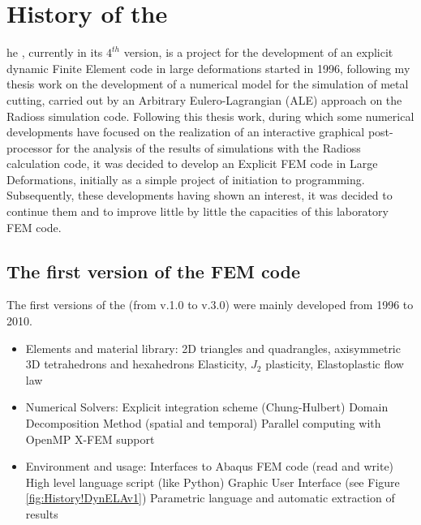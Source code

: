 %
%
%
\chapter{History of the \DynELA}\label{Chapter!History}

\startcontents[chapters]
\printmyminitoc[2]he \DynELA, currently in its $4^{th}$ version, is a project for the development of an explicit dynamic Finite Element code in large deformations started in 1996, following my thesis work on the development of a numerical model for the simulation of metal cutting, carried out by an Arbitrary Eulero-Lagrangian (ALE) approach on the Radioss simulation code. Following this thesis work, during which some numerical developments have focused on the realization of an interactive graphical post-processor for the analysis of the results of simulations with the Radioss calculation code, it was decided to develop an Explicit FEM code in Large Deformations, initially as a simple project of initiation to programming. Subsequently, these developments having shown an interest, it was decided to continue them and to improve little by little the capacities of this laboratory FEM code.

\section{The first version of the FEM code}
The first versions of the \DynELA (from v.1.0 to v.3.0) were mainly developed from 1996 to 2010.
\begin{itemize}
\item Elements and material library:
\subitem 2D triangles and quadrangles, axisymmetric
\subitem 3D tetrahedrons and hexahedrons
\subitem Elasticity, $J_{2}$ plasticity, Elastoplastic flow law
\item Numerical Solvers:
\subitem Explicit integration scheme (Chung-Hulbert)
\subitem Domain Decomposition Method (spatial and temporal)
\subitem Parallel computing with OpenMP
\subitem X-FEM support
\item Environment and usage:
\subitem Interfaces to Abaqus FEM code (read and write)
\subitem High level language script (like Python)
\subitem Graphic User Interface (see Figure \ref{fig:History!DynELAv1})
\subitem Parametric language and automatic extraction of results
\end{itemize}

